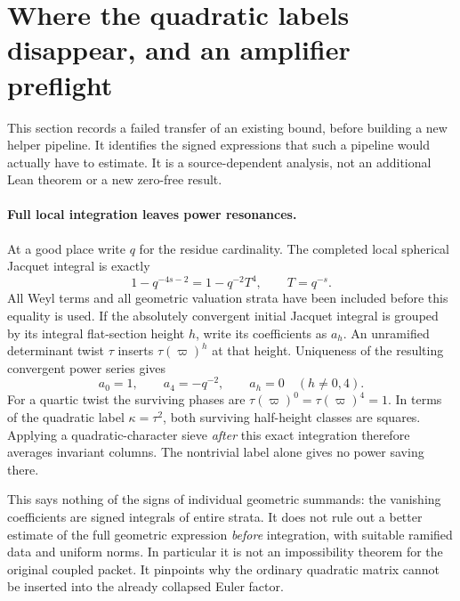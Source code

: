 \section{Where the quadratic labels disappear, and an amplifier preflight}
\label{sec:sp4-amplifier-preflight}

This section records a failed transfer of an existing bound, before
building a new helper pipeline. It identifies the signed expressions
that such a pipeline would actually have to estimate. It is a
source-dependent analysis, not an additional Lean theorem or a new
zero-free result.

\paragraph{Full local integration leaves power resonances.}
At a good place write \(q\) for the residue cardinality. The completed
local spherical Jacquet integral is exactly
\[
 1-q^{-4s-2}=1-q^{-2}T^4,\qquad T=q^{-s}.
\]
All Weyl terms and all geometric valuation strata have been included
before this equality is used. If the absolutely convergent initial
Jacquet integral is grouped by its integral flat-section height \(h\),
write its coefficients as \(a_h\). An unramified determinant twist
\(\tau\) inserts \(\tau(\varpi)^h\) at that height. Uniqueness of
the resulting convergent power series gives
\[
 a_0=1,\qquad a_4=-q^{-2},\qquad a_h=0\quad(h\ne0,4).
\]
For a quartic twist the surviving phases are
\(\tau(\varpi)^0=\tau(\varpi)^4=1\).
In terms of the quadratic label \(\kappa=\tau^2\), both surviving
half-height classes are squares. Applying a quadratic-character sieve
\emph{after} this exact integration therefore averages invariant
columns. The nontrivial label alone gives no power saving there.

This says nothing of the signs of individual geometric summands:
the vanishing coefficients are signed integrals of entire strata.
It does not rule out a better estimate of the full geometric expression
\emph{before} integration, with suitable ramified data and uniform
norms. In particular it is not an impossibility theorem for the
original coupled packet. It pinpoints why the ordinary quadratic
matrix cannot be inserted into the already collapsed Euler factor.

